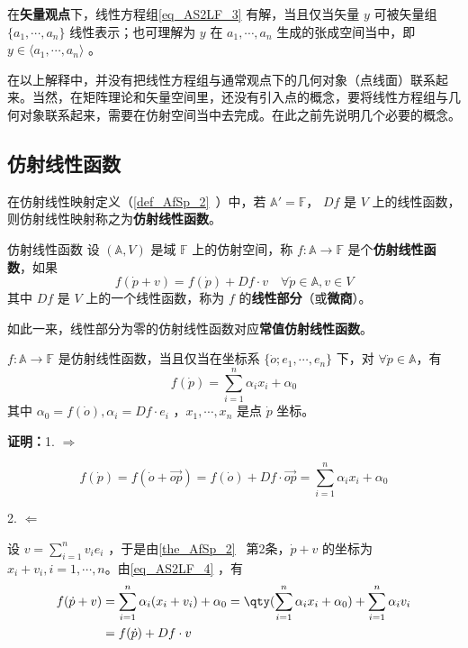 在\textbf{矢量观点}下，线性方程组\autoref{eq_AS2LF_3} 有解，当且仅当矢量 $y$ 可被矢量组 $\{a_1,\cdots,a_n\}$ 线性表示；也可理解为 $y$ 在 $a_1,\cdots,a_n$ 生成的张成空间当中，即$y\in\langle a_1,\cdots,a_n\rangle$ 。

在以上解释中，并没有把线性方程组与通常观点下的几何对象（点线面）联系起来。当然，在矩阵理论和矢量空间里，还没有引入点的概念，要将线性方程组与几何对象联系起来，需要在仿射空间当中去完成。在此之前先说明几个必要的概念。
\subsection{仿射线性函数}
在仿射线性映射定义（\autoref{def_AfSp_2}~）中，若 $\mathbb A'=\mathbb F$， $Df$ 是 $V$ 上的线性函数，则仿射线性映射称之为\textbf{仿射线性函数}。
\begin{definition}{仿射线性函数}
设 $(\mathbb A,V)$ 是域 $\mathbb {F}$ 上的仿射空间，称 $f:\mathbb A\rightarrow \mathbb F$ 是个\textbf{仿射线性函数}，如果
\begin{equation}
f(\dot p+v)=f(\dot p)+Df\cdot v\quad\forall \dot p\in\mathbb A,v\in V
\end{equation}
其中 $Df$ 是 $V$ 上的一个线性函数，称为 $f$ 的\textbf{线性部分}（或\textbf{微商}）。
\end{definition}
如此一来，线性部分为零的仿射线性函数对应\textbf{常值仿射线性函数}。
\begin{theorem}{}\label{the_AS2LF_1}
 $f:\mathbb A\rightarrow \mathbb F$ 是仿射线性函数，当且仅当在坐标系 $\{\dot o;e_1,\cdots,e_n\}$ 下，对 $\forall \dot p\in \mathbb A$，有
 \begin{equation}\label{eq_AS2LF_4}
 f(\dot p)=\sum_{i=1}^n\alpha_ix_i+\alpha_0
 \end{equation}
 其中 $\alpha_0=f(\dot o),\alpha_i=Df\cdot e_i$ ，$x_1,\cdots,x_n$ 是点 $\dot p$ 坐标。
\end{theorem}
\textbf{证明：}1. $\Rightarrow$

\begin{equation}
f(\dot p)=f(\dot o+\vec{op})=f(\dot o)+Df\cdot \vec{op}=\sum_{i=1}^n \alpha_i x_i+\alpha_0
\end{equation}

2. $\Leftarrow$

设 $v=\sum\limits_{i=1}^n v_ie_i$ ，于是由\autoref{the_AfSp_2}~ 第2条，$\dot p+v$ 的坐标为 $x_i+v_i,i=1,\cdots ,n$。由\autoref{eq_AS2LF_4} ，有
\begin{equation}
\begin{aligned}
f(\dot p+v)&=\sum_{i=1}^n\alpha_i(x_i+v_i)+\alpha_0=\qty(\sum_{i=1}^n\alpha_i x_i+\alpha_0)+\sum_{i=1}^n\alpha_i v_i\\
&=f(\dot p)+Df\cdot v
\end{aligned}
\end{equation}

